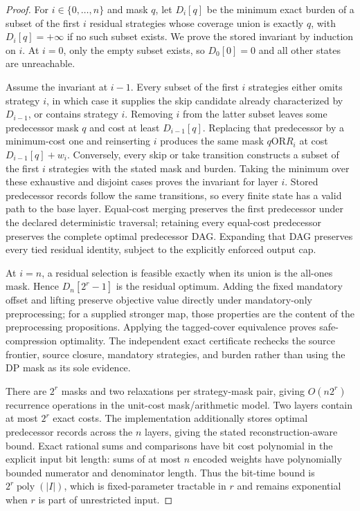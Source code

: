 \begin{proof}
For $i\in\{0,\ldots,n\}$ and mask $q$, let $D_i[q]$ be the minimum exact
burden of a subset of the first $i$ residual strategies whose coverage union
is exactly $q$, with $D_i[q]=+\infty$ if no such subset exists.  We prove the
stored invariant by induction on $i$.  At $i=0$, only the empty subset exists,
so $D_0[0]=0$ and all other states are unreachable.

Assume the invariant at $i-1$.  Every subset of the first $i$ strategies
either omits strategy $i$, in which case it supplies the skip candidate already
characterized by $D_{i-1}$, or contains strategy $i$.  Removing $i$ from the
latter subset leaves some predecessor mask $q$ and cost at least
$D_{i-1}[q]$. Replacing that predecessor by a minimum-cost one and reinserting
$i$ produces the same mask $q\mathbin{\mathrm{OR}}R_i$ at cost
$D_{i-1}[q]+w_i$. Conversely, every skip or take transition constructs
a subset of the first $i$ strategies with the stated mask and burden.  Taking
the minimum over these exhaustive and disjoint cases proves the invariant for
layer $i$.  Stored predecessor records follow the same transitions, so every
finite state has a valid path to the base layer.  Equal-cost merging preserves
the first predecessor under the declared deterministic traversal; retaining
every equal-cost predecessor preserves the complete optimal predecessor DAG.
Expanding that DAG preserves every tied residual identity, subject to the
explicitly enforced output cap.

At $i=n$, a residual selection is feasible exactly when its union is the
all-ones mask.  Hence $D_n[2^r-1]$ is the residual optimum.  Adding the fixed
mandatory offset and lifting preserve objective value directly under
mandatory-only preprocessing; for a supplied stronger map, those properties
are the content of the preprocessing propositions.  Applying the tagged-cover
equivalence proves safe-compression optimality.  The independent exact
certificate rechecks the source frontier, source closure, mandatory
strategies, and burden rather than using the DP mask as its sole evidence.

There are $2^r$ masks and two relaxations per strategy-mask pair, giving
$O(n2^r)$ recurrence operations in the unit-cost mask/arithmetic model.  Two
layers contain at most $2^r$ exact costs.  The implementation additionally
stores optimal predecessor records across the $n$ layers, giving the stated
reconstruction-aware bound.  Exact rational sums and comparisons have bit
cost polynomial in the explicit input bit length: sums of at most $n$ encoded
weights have polynomially bounded numerator and denominator length.  Thus the
bit-time bound is $2^r\operatorname{poly}(|I|)$, which is fixed-parameter
tractable in $r$ and remains exponential when $r$ is part of unrestricted
input.
\end{proof}

